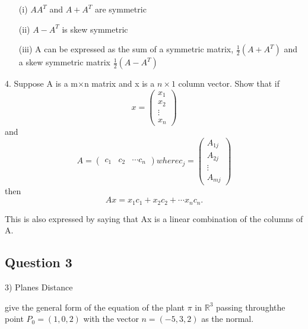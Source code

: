 \documentclass[12pt,a4paper]{article}
\begin{document}
\begin{itemize}
\item[(i)] $AA^T$ and $A+A^T$ are symmetric
\item[(ii)] $A-A^T$ is skew symmetric
\item[(iii)] A can be expressed as the sum of a symmetric matrix, $\frac{1}{2}(A+A^T)$ and a skew 
symmetric matrix $\frac{1}{2}(A-A^T)$
\end{itemize}

4. Suppose A is a m×n matrix and x is a $n \times 1$ column vector. Show that if 
\[x=\begin{pmatrix}x_1\\x_2\\\vdots\\x_n\end{pmatrix}\] and 
\[A=\begin{pmatrix}c_1 & c_2 &\cdots c_n \end{pmatrix} where c_j=\begin{pmatrix}A_{1j}\\A_{2j}\\\vdots\\A_{mj}\end{pmatrix}\]
 then \[Ax = x_1c_1+x_2c_2+\cdots x_nc_n. \]

This is also expressed by saying that Ax is a linear combination of the columns of A.
\newpage
\subsection*{Question 3}

3) Planes
	Distance


give the general form of the equation of the plant $\pi$ in $\mathbb{R}^3$ passing throughthe point $P_0 =(1,0,2)$ with the vector $n=(-5,3,2)$ as the normal.
\end{document}
